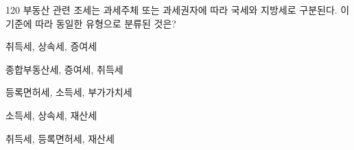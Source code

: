 \begin{question}{120}
부동산 관련 조세는 과세주체 또는 과세권자에 따라 국세와 지방세로 구분된다. 이 기준에 따라 동일한 유형으로 분류된 것은?
\begin{choices}
  \item 취득세, 상속세, 증여세
  \item 종합부동산세, 증여세, 취득세
  \item 등록면허세, 소득세, 부가가치세
  \item 소득세, 상속세, 재산세
  \item 취득세, 등록면허세, 재산세
\end{choices}
\end{question}
